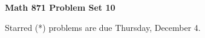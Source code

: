 \documentclass[12pt]{article}
\begin{document}
\def\ctln{\centerline}
\def\msk{\medskip}
\def\bsk{\bigskip}
\def\ssk{\smallskip}
\def\ra{\rightarrow}
\def\ubr{\underbar}
\def\sset{\subseteq}
\def\smin{\setminus}

\def\mt{{\mathcal T}}
\def\mb{{\mathcal B}}
\def\ms{{\mathcal S}}
\def\mu{{\mathcal U}}
\def\mv{{\mathcal V}}
\def\mc{{\mathcal C}}

\def\mtp{{\mathcal T}^\prime}
\def\mbp{{\mathcal B}^\prime}
\def\mcp{{\mathcal C}^\prime}

\def\bbr{{\mathbb R}}
\def\bbz{{\mathbb Z}}
\def\spc{$~$\hskip.15in$~$}






\ctln{\bf Math 871 Problem Set 10}

\msk

Starred (*) problems are due Thursday, December 4.
\end{document}
